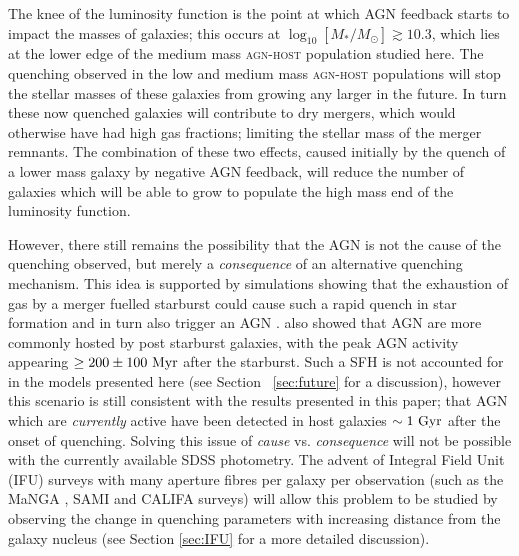 The knee of the luminosity function is the point at which AGN feedback starts to impact the masses of galaxies; this occurs at $\log_{10}[M_*/M_{\odot}] \gtrsim 10.3$, which lies at the lower edge of the medium mass \textsc{agn-host} population studied here. The quenching observed in the low and medium mass \textsc{agn-host} populations will stop the stellar masses of these galaxies from growing any larger in the future. In turn these now quenched galaxies will contribute to dry mergers, which would otherwise have had high gas fractions; limiting the stellar mass of the merger remnants. The combination of these two effects, caused initially by the quench of a lower mass galaxy by negative AGN feedback, will reduce the number of galaxies which will be able to grow to populate the high mass end of the luminosity function. 

However, there still remains the possibility that the AGN is not the cause of the quenching observed, but merely a \emph{consequence} of an alternative quenching mechanism. This idea is supported by simulations showing that the exhaustion of gas by a merger fuelled starburst could cause such a rapid quench in star formation and in turn also trigger an AGN \citep{Croton06, Wild09, snyder11, hayward14}. \citet{Yesuf14} also showed that AGN are more commonly hosted by post starburst galaxies, with the peak AGN activity appearing $\geq 200 \pm 100 ~\rm{Myr}$ after the starburst. Such a SFH is not accounted for in the models presented here (see Section ~\ref{sec:future} for a discussion), however this scenario is still consistent with the results presented in this paper; that AGN which are \emph{currently} active have been detected in host galaxies $\sim 1~\rm{Gyr}$ after the onset of quenching. Solving this issue of \emph{cause} vs. \emph{consequence} will not be possible with the currently available SDSS photometry. The advent of Integral Field Unit (IFU) surveys with many aperture fibres per galaxy per observation (such as the MaNGA \citep{bundy15}, SAMI \citep{croom12} and CALIFA \citep{sanchez12} surveys) will allow this problem to be studied by observing the change in quenching parameters with increasing distance from the galaxy nucleus (see Section \ref{sec:IFU} for a more detailed discussion). 
 

